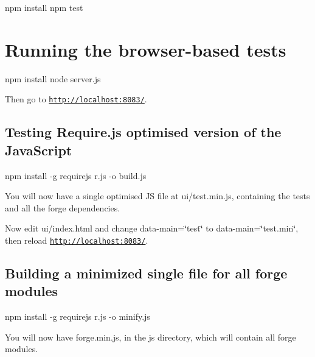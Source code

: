 npm install npm test

\section*{Running the browser-\/based tests }

\begin{DoxyVerb}npm install
node server.js
\end{DoxyVerb}


Then go to \href{http://localhost:8083/}{\tt http\+://localhost\+:8083/}.

\subsection*{Testing Require.\+js optimised version of the Java\+Script }

\begin{DoxyVerb}npm install -g requirejs
r.js -o build.js
\end{DoxyVerb}


You will now have a single optimised JS file at ui/test.\+min.\+js, containing the tests and all the forge dependencies.

Now edit ui/index.\+html and change {\ttfamily data-\/main=\char`\"{}test\char`\"{}} to {\ttfamily data-\/main=\char`\"{}test.\+min\char`\"{}}, then reload \href{http://localhost:8083/}{\tt http\+://localhost\+:8083/}.

\subsection*{Building a minimized single file for all forge modules }

\begin{DoxyVerb}npm install -g requirejs
r.js -o minify.js
\end{DoxyVerb}


You will now have forge.\+min.\+js, in the \textquotesingle{}js\textquotesingle{} directory, which will contain all forge modules. 